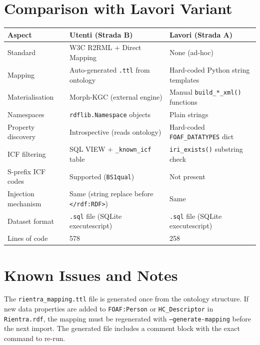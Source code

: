﻿\documentclass[12pt,a4paper]{article}
\begin{document}
\clearpage
\section{Comparison with Lavori Variant}

\begin{longtable}{@{}P{4cm}P{5.5cm}P{5.5cm}@{}}
\toprule
\textbf{Aspect} & \textbf{Utenti (Strada B)} & \textbf{Lavori (Strada A)} \\
\midrule
\endhead
Standard & W3C R2RML + Direct Mapping & None (ad-hoc) \\
Mapping & Auto-generated \texttt{.ttl} from ontology & Hard-coded Python string templates \\
Materialisation & Morph-KGC (external engine) & Manual \texttt{build\_*\_xml()} functions \\
Namespaces & \texttt{rdflib.Namespace} objects & Plain strings \\
Property discovery & Introspective (reads ontology) & Hard-coded \texttt{FOAF\_DATATYPES} dict \\
ICF filtering & SQL VIEW + \texttt{\_known\_icf} table & \texttt{iri\_exists()} substring check \\
S-prefix ICF codes & Supported (\texttt{BS1qual}) & Not present \\
Injection mechanism & Same (string replace before \texttt{</rdf:RDF>}) & Same \\
Dataset format & \texttt{.sql} file (SQLite executescript) & \texttt{.sql} file (SQLite executescript) \\
Lines of code & 578 & 258 \\
\bottomrule
\end{longtable}

\clearpage
\section{Known Issues and Notes}

\begin{tcolorbox}[colback=noteblue!40, colframe=blue!60!black,
                  title=Note: Mapping must be regenerated after ontology changes]
The \texttt{rientra\_mapping.ttl} file is generated once from the ontology structure. If new data properties are added to \texttt{FOAF:Person} or \texttt{HC\_Descriptor} in \texttt{Rientra.rdf}, the mapping must be regenerated with \texttt{--generate-mapping} before the next import. The generated file includes a comment block with the exact command to re-run.
\end{tcolorbox}
\end{document}
